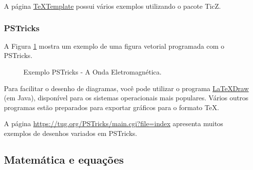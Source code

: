 \begin{marker}
  A página \href{http://texample.net/tikz/examples/}{TeXTemplate} possui vários exemplos utilizando o pacote TicZ.
\end{marker}

\subsubsection*{PSTricks}

A Figura \ref{fig:exe_pstricks} mostra um exemplo de uma figura vetorial programada com o PSTricks.

\begin{figure}[H]
\label{fig:exe_pstricks}
    \begin{center}
        \resizebox{0.9\textwidth}{!}{}
    \end{center}
\caption{Exemplo PSTricks - A Onda Eletromagnética.}
\end{figure}

Para facilitar o desenho de diagramas, você pode utilizar o programa \href{http://latexdraw.sourceforge.net}{LaTeXDraw} (em Java), disponível para os sistemas operacionais mais populares. Vários outros programas estão preparados para exportar gráficos para o formato TeX.

\begin{marker}
A página \url{https://tug.org/PSTricks/main.cgi?file=index} apresenta muitos exemplos de desenhos variados em PSTricks.
\end{marker}

\subsection{Matemática e equações}
\label{sec:mat_eqs}

